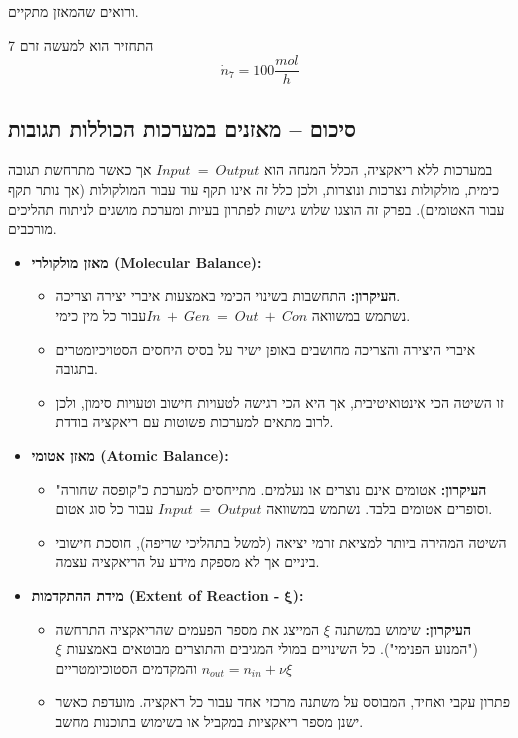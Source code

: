 \documentclass[
  hebrew,
  letterpaper,
  DIV=11,
  numbers=noendperiod]{scrreprt}
\begin{document}
ורואים שהמאזן מתקיים.

התחזיר הוא למעשה זרם 7 \[{\dot{n}}_{7} = 100\frac{mol}{h}\]

\subsection{סיכום -- מאזנים במערכות הכוללות
תגובות}\label{ux5e1ux5d9ux5dbux5d5ux5dd-ux5deux5d0ux5d6ux5e0ux5d9ux5dd-ux5d1ux5deux5e2ux5e8ux5dbux5d5ux5ea-ux5d4ux5dbux5d5ux5dcux5dcux5d5ux5ea-ux5eaux5d2ux5d5ux5d1ux5d5ux5ea}

במערכות ללא ריאקציה, הכלל המנחה הוא \(Input\  = \ Output\) אך כאשר
מתרחשת תגובה כימית, מולקולות נצרכות ונוצרות, ולכן כלל זה אינו תקף עוד
עבור המולקולות (אך נותר תקף עבור האטומים). בפרק זה הוצגו שלוש גישות
לפתרון בעיות ומערכת מושגים לניתוח תהליכים מורכבים.

\begin{itemize}
\item
  \textbf{מאזן מולקולרי (Molecular Balance):}

  \begin{itemize}
  \item
    \textbf{העיקרון:} התחשבות בשינוי הכימי באמצעות איברי יצירה וצריכה.\\
    נשתמש במשוואה \(In\  + \ Gen\  = \ Out\  + \ Con\)עבור כל מין כימי.
  \item
    איברי היצירה והצריכה מחושבים באופן ישיר על בסיס היחסים הסטויכיומטרים
    בתגובה.
  \item
    זו השיטה הכי אינטואיטיבית, אך היא הכי רגישה לטעויות חישוב וטעויות
    סימון, ולכן לרוב מתאים למערכות פשוטות עם ריאקציה בודדת.
  \end{itemize}
\item
  \textbf{מאזן אטומי (Atomic Balance):}

  \begin{itemize}
  \item
    \textbf{העיקרון:} אטומים אינם נוצרים או נעלמים. מתייחסים למערכת
    כ"קופסה שחורה" וסופרים אטומים בלבד. נשתמש במשוואה
    \(Input\  = \ Output\) עבור כל סוג אטום.
  \item
    השיטה המהירה ביותר למציאת זרמי יציאה (למשל בתהליכי שריפה), חוסכת
    חישובי ביניים אך לא מספקת מידע על הריאקציה עצמה.
  \end{itemize}
\item
  \textbf{מידת ההתקדמות (Extent of Reaction -}
  \(\mathbf{\xi}\)\textbf{):}

  \begin{itemize}
  \item
    \textbf{העיקרון:} שימוש במשתנה \(\xi\) המייצג את מספר הפעמים
    שהריאקציה התרחשה ("המנוע הפנימי"). כל השינויים במולי המגיבים
    והתוצרים מבוטאים באמצעות \(\xi\) והמקדמים הסטוכיומטריים
    \(n_{out} = n_{in} + \nu\xi\)
  \item
    פתרון עקבי ואחיד, המבוסס על משתנה מרכזי אחד עבור כל ראקציה. מועדפת
    כאשר ישנן מספר ריאקציות במקביל או בשימוש בתוכנות מחשב.
  \end{itemize}
\end{itemize}
\end{document}
